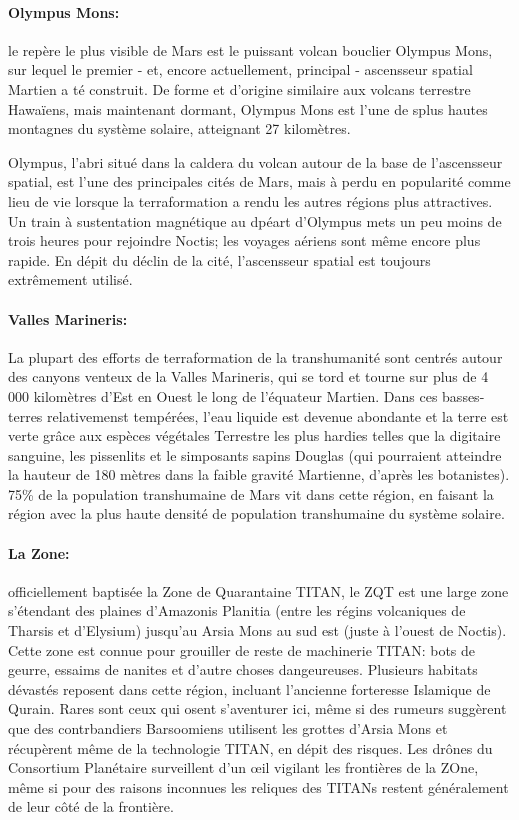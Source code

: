 \paragraph{Olympus Mons:} \label{sec:olympus-mons} le repère le plus visible de Mars est le puissant volcan bouclier Olympus Mons, sur lequel le premier - et, encore actuellement, principal - ascensseur spatial Martien a té construit. De forme et d'origine similaire aux volcans terrestre Hawaïens, mais maintenant dormant, Olympus Mons est l'une de splus hautes montagnes du système solaire, atteignant 27 kilomètres. 

Olympus, l'abri situé dans la caldera du volcan autour de la base de l'ascensseur spatial, est l'une des principales cités de Mars, mais à perdu en popularité comme lieu de vie lorsque la terraformation a rendu les autres régions plus attractives. Un train à sustentation magnétique au dpéart d'Olympus mets un peu moins de trois heures pour rejoindre Noctis; les voyages aériens sont même encore plus rapide. En dépit du déclin de la cité, l'ascensseur spatial est toujours extrêmement utilisé. 

\paragraph{Valles Marineris:} \label{sec:valles-marineris} La plupart des efforts de terraformation de la transhumanité sont centrés autour des canyons venteux de la Valles Marineris, qui se tord et tourne sur plus de 4 000 kilomètres d'Est en Ouest le long de l'équateur Martien. Dans ces basses-terres relativemenst tempérées, l'eau liquide est devenue abondante et la terre est verte grâce aux espèces végétales Terrestre les plus hardies telles que la digitaire sanguine, les pissenlits et le simposants sapins Douglas (qui pourraient atteindre la hauteur de 180 mètres dans la faible gravité Martienne, d'après les botanistes). 75\% de la population transhumaine de Mars vit dans cette région, en faisant la région avec la plus haute densité de population transhumaine du système solaire. 

\paragraph{La Zone:} \label{sec:zone} officiellement baptisée la Zone de Quarantaine TITAN, le ZQT est une large zone s'étendant des plaines d'Amazonis Planitia (entre les régins volcaniques de Tharsis et d'Elysium) jusqu'au Arsia Mons au sud est (juste à l'ouest de Noctis). Cette zone est connue pour grouiller de reste de machinerie TITAN: bots de geurre, essaims de nanites et d'autre choses dangeureuses. Plusieurs habitats dévastés reposent dans cette région, incluant l'ancienne forteresse Islamique de Qurain. Rares sont ceux qui osent s'aventurer ici, même si des rumeurs suggèrent que des contrbandiers Barsoomiens utilisent les grottes d'Arsia Mons et récupèrent même de la technologie TITAN, en dépit des risques. Les drônes du Consortium Planétaire surveillent d'un œil vigilant les frontières de la ZOne, même si pour des raisons inconnues les reliques des TITANs restent généralement de leur côté de la frontière. 

